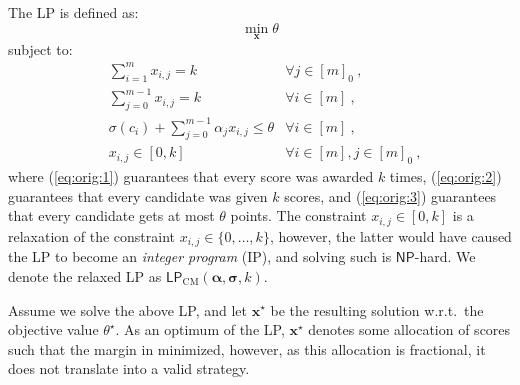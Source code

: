 \documentclass[letterpaper]{article} %
\newtheorem{lemma}[theorem]{Lemma}
\theoremstyle{definition}
\newcommand\vecc{\mathbf}
\newcommand\vecgreek{\bm}
\newcommand{\veca}{\vecgreek{\alpha}}
\newcommand{\vecs}{\vecgreek{\sigma}}
\newcommand{\NP}{\mathsf{NP}}
\newcommand{\LPCM}{\mathsf{LP}_{\mathrm{CM}}}
\newcommand{\EE}{\mathbb{E}}
\begin{document}
The LP is defined as:
\begin{equation}
\min_{\vecc{x}} \theta
\end{equation} 
subject to:
\begin{align}
&\sum_{i=1}^m x_{i,j}=k &\forall j\in[m]_0\label{eq:orig:1}\ ,\\
&\sum_{j=0}^{m-1}x_{i,j}=k &\forall i\in[m]\label{eq:orig:2}\ ,\\
&\sigma(c_i)+ \sum_{j=0}^{m-1}\alpha_j x_{i,j}\leq \theta &\forall i\in[m]\label{eq:orig:3}\ ,\\
&x_{i,j} \in [0,k] & \forall i\in[m],j\in[m]_0\label{eq:to_rel}\ ,
\end{align}
where (\ref{eq:orig:1}) guarantees that every score was awarded $k$ times, (\ref{eq:orig:2}) guarantees that every candidate was given $k$ scores, and (\ref{eq:orig:3}) guarantees that  every candidate gets at most $\theta$ points. The constraint $x_{i,j} \in [0,k]$ is a relaxation of the constraint $x_{i,j} \in \{0,\ldots,k\}$, however, the latter would have  caused the LP to become an \emph{integer program} (IP), and solving such is $\NP$-hard.  We denote the relaxed LP as $\LPCM(\veca, \vecs, k)$.


Assume we solve the above LP, and let $\vecc{x^\star}$ be the resulting solution w.r.t.\ the objective value $\theta^\star$. As an optimum of the LP, $\vecc{x^\star}$ denotes some allocation of scores such that the margin in minimized, however, as this allocation is fractional, it does not translate into a valid strategy. 
\end{document}

